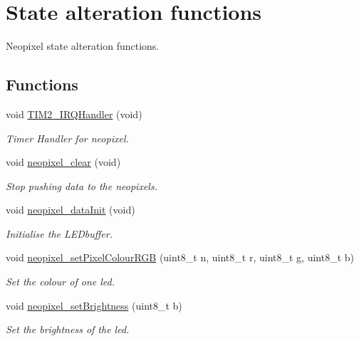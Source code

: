 \hypertarget{group___neo_pixel___state}{}\section{State alteration functions}
\label{group___neo_pixel___state}


Neopixel state alteration functions.  


\subsection*{Functions}
\begin{DoxyCompactItemize}
\item 
void \hyperlink{group___neo_pixel___state_ga38ad4725462bdc5e86c4ead4f04b9fc2}{T\+I\+M2\+\_\+\+I\+R\+Q\+Handler} (void)
\begin{DoxyCompactList}\small\item\em Timer Handler for neopixel. \end{DoxyCompactList}\item 
void \hyperlink{group___neo_pixel___state_ga8e3cfef785ce221672f825f8785c25b8}{neopixel\+\_\+clear} (void)
\begin{DoxyCompactList}\small\item\em Stop pushing data to the neopixels. \end{DoxyCompactList}\item 
void \hyperlink{group___neo_pixel___state_ga79e34feddcfb2c45ae218166c84bdff4}{neopixel\+\_\+data\+Init} (void)
\begin{DoxyCompactList}\small\item\em Initialise the L\+E\+Dbuffer. \end{DoxyCompactList}\item 
void \hyperlink{group___neo_pixel___state_ga63c196a71ffb007411929e41ba5df41d}{neopixel\+\_\+set\+Pixel\+Colour\+R\+GB} (uint8\+\_\+t n, uint8\+\_\+t r, uint8\+\_\+t g, uint8\+\_\+t b)
\begin{DoxyCompactList}\small\item\em Set the colour of one led. \end{DoxyCompactList}\item 
void \hyperlink{group___neo_pixel___state_gae027558106eef5c81996294f4561fecb}{neopixel\+\_\+set\+Brightness} (uint8\+\_\+t b)
\begin{DoxyCompactList}\small\item\em Set the brightness of the led. \end{DoxyCompactList}\end{DoxyCompactItemize}


